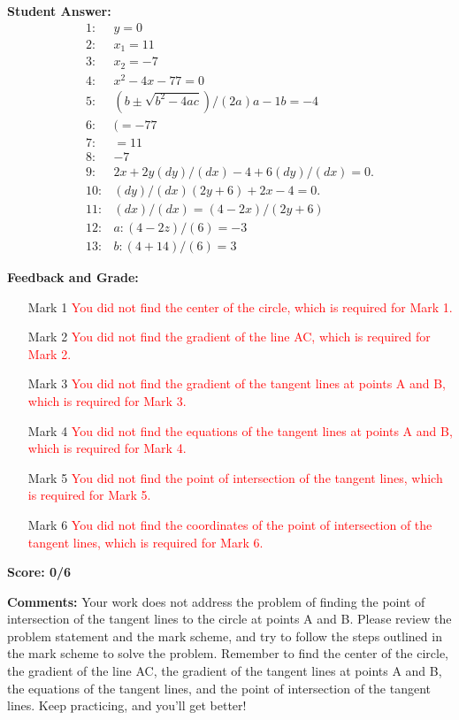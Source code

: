 \documentclass{article}
\begin{document}
\textbf{Student Answer:}
\begin{align*}
1: & y=0 \\
2: & x_1=11 \\
3: & x_2=-7 \\
4: & x^{2}-4x-77=0 \\
5: & (b\pm\sqrt{b^{2}-4ac})/(2a)a-1b=-4 \\
6: & (=-77 \\
7: & =11 \\
8: & -7 \\
9: & 2x+2y(dy)/(dx)-4+6(dy)/(dx)=0. \\
10: & (dy)/(dx)(2y+6)+2x-4=0. \\
11: & (dx)/(dx)=(4-2x)/(2y+6) \\
12: & a:(4-2z)/(6)=-3 \\
13: & b:(4+14)/(6)=3
\end{align*}

\textbf{Feedback and Grade:}
\begin{itemize}
\item[Mark 1] \textcolor{red}{You did not find the center of the circle, which is required for Mark 1.}
\item[Mark 2] \textcolor{red}{You did not find the gradient of the line AC, which is required for Mark 2.}
\item[Mark 3] \textcolor{red}{You did not find the gradient of the tangent lines at points A and B, which is required for Mark 3.}
\item[Mark 4] \textcolor{red}{You did not find the equations of the tangent lines at points A and B, which is required for Mark 4.}
\item[Mark 5] \textcolor{red}{You did not find the point of intersection of the tangent lines, which is required for Mark 5.}
\item[Mark 6] \textcolor{red}{You did not find the coordinates of the point of intersection of the tangent lines, which is required for Mark 6.}
\end{itemize}

\textbf{Score: 0/6}

\textbf{Comments:} Your work does not address the problem of finding the point of intersection of the tangent lines to the circle at points A and B. Please review the problem statement and the mark scheme, and try to follow the steps outlined in the mark scheme to solve the problem. Remember to find the center of the circle, the gradient of the line AC, the gradient of the tangent lines at points A and B, the equations of the tangent lines, and the point of intersection of the tangent lines. Keep practicing, and you'll get better!
\end{document}
